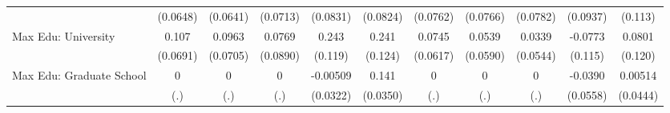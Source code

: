 {\begin{tabular}{l*{10}{c}}
            &    (0.0648)         &    (0.0641)         &    (0.0713)         &    (0.0831)         &    (0.0824)         &    (0.0762)         &    (0.0766)         &    (0.0782)         &    (0.0937)         &     (0.113)         \\
\addlinespace
Max Edu: University&       0.107         &      0.0963         &      0.0769         &       0.243\sym{*}  &       0.241         &      0.0745         &      0.0539         &      0.0339         &     -0.0773         &      0.0801         \\
            &    (0.0691)         &    (0.0705)         &    (0.0890)         &     (0.119)         &     (0.124)         &    (0.0617)         &    (0.0590)         &    (0.0544)         &     (0.115)         &     (0.120)         \\
\addlinespace
Max Edu: Graduate School&           0         &           0         &           0         &    -0.00509         &       0.141\sym{***}&           0         &           0         &           0         &     -0.0390         &     0.00514         \\
            &         (.)         &         (.)         &         (.)         &    (0.0322)         &    (0.0350)         &         (.)         &         (.)         &         (.)         &    (0.0558)         &    (0.0444)         \\
\bottomrule
\end{tabular}
}
